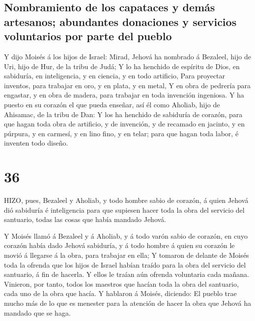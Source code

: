 \hypertarget{nombramiento-de-los-capataces-y-demuxe1s-artesanos-abundantes-donaciones-y-servicios-voluntarios-por-parte-del-pueblo}{%
\subsection{Nombramiento de los capataces y demás artesanos; abundantes
donaciones y servicios voluntarios por parte del
pueblo}\label{nombramiento-de-los-capataces-y-demuxe1s-artesanos-abundantes-donaciones-y-servicios-voluntarios-por-parte-del-pueblo}}

 Y dijo Moisés á los hijos de Israel: Mirad, Jehová ha
nombrado á Bezaleel, hijo de Uri, hijo de Hur, de la tribu de Judá;
 Y lo ha henchido de espíritu de Dios, en sabiduría, en
inteligencia, y en ciencia, y en todo artificio,  Para
proyectar inventos, para trabajar en oro, y en plata, y en metal,
 Y en obra de pedrería para engastar, y en obra de madera,
para trabajar en toda invención ingeniosa.  Y ha puesto en
su corazón el que pueda enseñar, así él como Aholiab, hijo de Ahisamac,
de la tribu de Dan:  Y los ha henchido de sabiduría de
corazón, para que hagan toda obra de artificio, y de invención, y de
recamado en jacinto, y en púrpura, y en carmesí, y en lino fino, y en
telar; para que hagan toda labor, é inventen todo diseño.

\hypertarget{section-35}{%
\section{36}\label{section-35}}

 HIZO, pues, Bezaleel y Aholiab, y todo hombre sabio de
corazón, á quien Jehová dió sabiduría é inteligencia para que supiesen
hacer toda la obra del servicio del santuario, todas las cosas que había
mandado Jehová.

 Y Moisés llamó á Bezaleel y á Aholiab, y á todo varón sabio
de corazón, en cuyo corazón había dado Jehová sabiduría, y á todo hombre
á quien su corazón le movió á llegarse á la obra, para trabajar en ella;
 Y tomaron de delante de Moisés toda la ofrenda que los
hijos de Israel habían traído para la obra del servicio del santuario, á
fin de hacerla. Y ellos le traían aún ofrenda voluntaria cada mañana.
 Vinieron, por tanto, todos los maestros que hacían toda la
obra del santuario, cada uno de la obra que hacía.  Y
hablaron á Moisés, diciendo: El pueblo trae mucho más de lo que es
menester para la atención de hacer la obra que Jehová ha mandado que se
haga.


